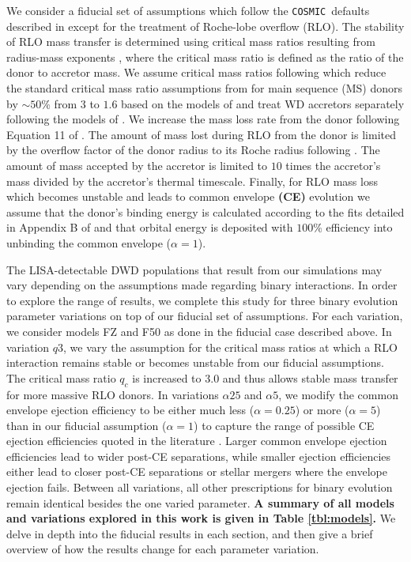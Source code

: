 \documentclass[twocolumn, linenumbers]{aastex631}
\newcommand{\cosmic}{\texttt{COSMIC}}
\begin{document}
We consider a fiducial set of assumptions which follow the \cosmic\ defaults described in \citet{Breivik2020a} except for the treatment of Roche-lobe overflow (RLO). The stability of RLO mass transfer is determined using critical mass ratios resulting from radius-mass exponents \citep{Webbink1985, Hurley2002}, where the critical mass ratio is defined as the ratio of the donor to accretor mass. We assume critical mass ratios following \citet{Claeys2014} which reduce the standard critical mass ratio assumptions from \citet{Hurley2002} for main sequence (MS) donors by $\sim50\%$ from $3$ to $1.6$ based on the models of \citet{deMink2007} and treat WD accretors separately following the models of \citet{Soberman1997}. We increase the mass loss rate from the donor following Equation 11 of \citet{Claeys2014}. The amount of mass lost during RLO from the donor is limited by the overflow factor of the donor radius to its Roche radius following \citet{Hurley2002}. The amount of mass accepted by the accretor is limited to $10$ times the accretor's mass divided by the accretor's thermal timescale. Finally, for RLO mass loss which becomes unstable and leads to common envelope \textbf{(CE)} evolution we assume that the donor's binding energy is calculated according to the fits detailed in Appendix B of \citet{Claeys2014} and that orbital energy is deposited with $100\%$ efficiency into unbinding the common envelope ($\alpha=1$).

The LISA-detectable DWD populations that result from our simulations may vary depending on the assumptions made regarding binary interactions. In order to explore the range of results, we complete this study for three binary evolution parameter variations on top of our fiducial set of assumptions. For each variation, we consider models FZ and F50 as done in the fiducial case described above. In variation $q3$, we vary the assumption for the critical mass ratios at which a RLO interaction remains stable or becomes unstable from our fiducial assumptions. The critical mass ratio $q_c$ is increased to $3.0$ and thus allows stable mass transfer for more massive RLO donors. In variations $\alpha25$ and $\alpha5$, we modify the common envelope ejection efficiency to be either much less ($\alpha=0.25$) or more ($\alpha=5$) than in our fiducial assumption ($\alpha=1$) to capture the range of possible CE ejection efficiencies quoted in the literature  \citep[e.g.][]{Zorotovic2010, Fragos2019}. Larger common envelope ejection efficiencies lead to wider post-CE separations, while smaller ejection efficiencies either lead to closer post-CE separations or stellar mergers where the envelope ejection fails. Between all variations, all other prescriptions for binary evolution remain identical besides the one varied parameter. \textbf{A summary of all models and variations explored in this work is given in Table \ref{tbl:models}.} We delve in depth into the fiducial results in each section, and then give a brief overview of how the results change for each parameter variation. 
\end{document}
